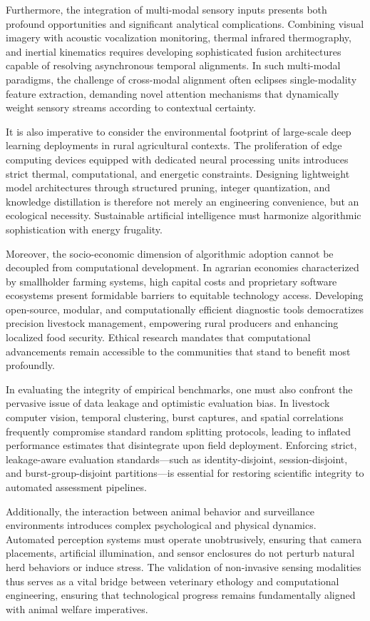 \documentclass[Times,12pt,oneside,openany,print,index]{report}
\begin{document}
Furthermore, the integration of multi-modal sensory inputs presents both profound opportunities and significant analytical complications. Combining visual imagery with acoustic vocalization monitoring, thermal infrared thermography, and inertial kinematics requires developing sophisticated fusion architectures capable of resolving asynchronous temporal alignments. In such multi-modal paradigms, the challenge of cross-modal alignment often eclipses single-modality feature extraction, demanding novel attention mechanisms that dynamically weight sensory streams according to contextual certainty.

It is also imperative to consider the environmental footprint of large-scale deep learning deployments in rural agricultural contexts. The proliferation of edge computing devices equipped with dedicated neural processing units introduces strict thermal, computational, and energetic constraints. Designing lightweight model architectures through structured pruning, integer quantization, and knowledge distillation is therefore not merely an engineering convenience, but an ecological necessity. Sustainable artificial intelligence must harmonize algorithmic sophistication with energy frugality.

Moreover, the socio-economic dimension of algorithmic adoption cannot be decoupled from computational development. In agrarian economies characterized by smallholder farming systems, high capital costs and proprietary software ecosystems present formidable barriers to equitable technology access. Developing open-source, modular, and computationally efficient diagnostic tools democratizes precision livestock management, empowering rural producers and enhancing localized food security. Ethical research mandates that computational advancements remain accessible to the communities that stand to benefit most profoundly.

In evaluating the integrity of empirical benchmarks, one must also confront the pervasive issue of data leakage and optimistic evaluation bias. In livestock computer vision, temporal clustering, burst captures, and spatial correlations frequently compromise standard random splitting protocols, leading to inflated performance estimates that disintegrate upon field deployment. Enforcing strict, leakage-aware evaluation standards—such as identity-disjoint, session-disjoint, and burst-group-disjoint partitions—is essential for restoring scientific integrity to automated assessment pipelines.

Additionally, the interaction between animal behavior and surveillance environments introduces complex psychological and physical dynamics. Automated perception systems must operate unobtrusively, ensuring that camera placements, artificial illumination, and sensor enclosures do not perturb natural herd behaviors or induce stress. The validation of non-invasive sensing modalities thus serves as a vital bridge between veterinary ethology and computational engineering, ensuring that technological progress remains fundamentally aligned with animal welfare imperatives.
\end{document}
